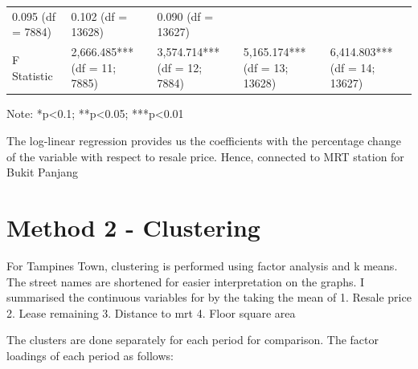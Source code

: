 \documentclass[]{book}
\begin{document}
\begin{longtable}[]{@{}lllll@{}}
\begin{minipage}[t]{0.17\columnwidth}
0.095 (df = 7884)\strut
\end{minipage} & \begin{minipage}[t]{0.18\columnwidth}\raggedright\strut
0.102 (df = 13628)\strut
\end{minipage} & \begin{minipage}[t]{0.18\columnwidth}\raggedright\strut
0.090 (df = 13627)\strut
\end{minipage}\tabularnewline
\begin{minipage}[t]{0.15\columnwidth}\raggedright\strut
F Statistic\strut
\end{minipage} & \begin{minipage}[t]{0.17\columnwidth}\raggedright\strut
2,666.485*** (df = 11; 7885)\strut
\end{minipage} & \begin{minipage}[t]{0.17\columnwidth}\raggedright\strut
3,574.714*** (df = 12; 7884)\strut
\end{minipage} & \begin{minipage}[t]{0.18\columnwidth}\raggedright\strut
5,165.174*** (df = 13; 13628)\strut
\end{minipage} & \begin{minipage}[t]{0.18\columnwidth}\raggedright\strut
6,414.803*** (df = 14; 13627)\strut
\end{minipage}\tabularnewline
\bottomrule
\end{longtable}

Note: *p\textless{}0.1; **p\textless{}0.05; ***p\textless{}0.01

The log-linear regression provides us the coefficients with the
percentage change of the variable with respect to resale price. Hence,
connected to MRT station for Bukit Panjang

\chapter{Method 2 - Clustering}\label{method-2---clustering}

For Tampines Town, clustering is performed using factor analysis and k
means. The street names are shortened for easier interpretation on the
graphs. I summarised the continuous variables for by the taking the mean
of 1. Resale price 2. Lease remaining 3. Distance to mrt 4. Floor square
area

The clusters are done separately for each period for comparison. The
factor loadings of each period as follows:
\end{document}
